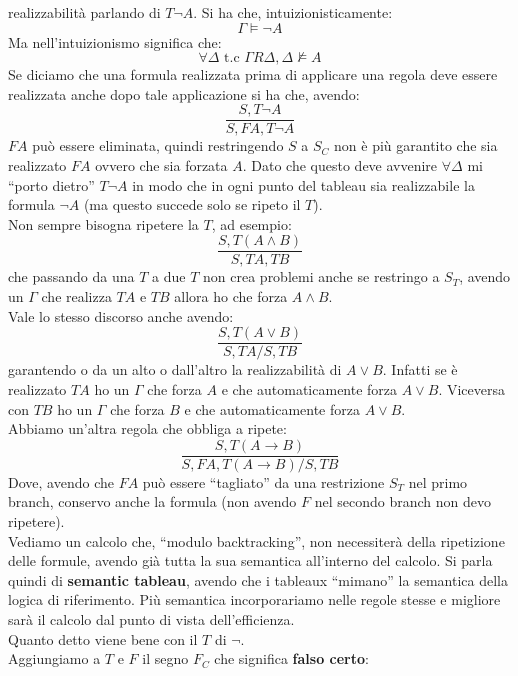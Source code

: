 \documentclass[a4paper,12pt, oneside]{book}
\begin{document}
realizzabilità parlando di $T\neg A$. Si ha che, intuizionisticamente:
\[\Gamma\vDash \neg A\]
Ma nell'intuizionismo significa che:
\[\forall\Delta \mbox{ t.c }\Gamma R \Delta, \Delta\nvDash A\]
Se diciamo che una formula realizzata prima di applicare una regola deve essere
realizzata anche dopo tale applicazione si ha che, avendo:
\[\frac{S, T\neg A}{S, FA, T\neg A}\]
$FA$ può essere eliminata, quindi restringendo $S$ a $S_C$ non è più garantito
che sia realizzato $FA$ ovvero che sia forzata $A$. Dato che questo deve
avvenire $\forall\Delta$ mi ``porto dietro'' $T\neg A$ in modo che in ogni punto
del tableau sia realizzabile la formula $\neg A$ (ma questo succede solo se
ripeto il $T$).\\
Non sempre bisogna ripetere la $T$, ad esempio:
\[\frac{S, T(A\land B)}{S, TA, TB}\]
che passando da una $T$ a due $T$ non crea problemi anche se restringo a
$S_T$, avendo un $\Gamma$ che realizza $TA$ e $TB$ allora ho che forza $A\land
B$.\\
Vale lo stesso discorso anche avendo:    
\[\frac{S, T(A\lor B)}{S, TA/S, TB}\]
garantendo o da un alto o dall'altro la realizzabilità di $A\lor B$. Infatti se
è 
realizzato $TA$ ho un $\Gamma$ che forza $A$ e che automaticamente forza $A\lor
B$. Viceversa con $TB$ ho un $\Gamma$ che forza $B$ e che automaticamente forza
$A\lor B$.\\
Abbiamo un'altra regola che obbliga a ripete:
\[\frac{S, T(A\to B)}{S, FA, T(A\to B)/S, TB}\]
Dove, avendo che $FA$ può essere ``tagliato'' da una restrizione $S_T$ nel primo
branch, conservo anche la formula (non avendo $F$ nel secondo branch non devo
ripetere). \\
Vediamo un calcolo che, ``modulo backtracking'', non necessiterà della
ripetizione delle formule, avendo già tutta la sua semantica all'interno del
calcolo. Si parla quindi di \textbf{semantic tableau}, avendo che i tableaux
``mimano'' la semantica della logica di riferimento. Più semantica
incorporariamo nelle regole stesse e migliore sarà il calcolo dal punto di vista
dell'efficienza.\\
Quanto detto viene bene con il $T$ di $\neg$.\\
Aggiungiamo a $T$ e $F$ il segno $F_C$ che significa \textbf{falso certo}:
\end{document}
